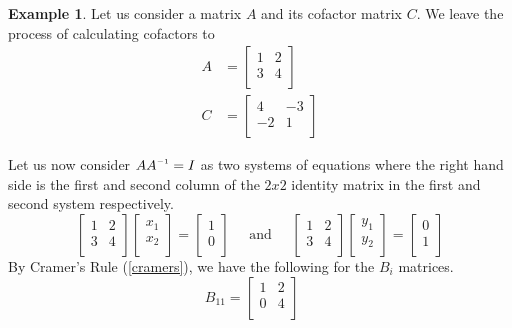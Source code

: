\documentclass[11pt,reqno]{amsart}
\theoremstyle{definition}
\newtheorem{example}[theorem]{Example}
\newcommand{\inv}{^{\raisebox{.2ex}{$\scriptscriptstyle-1$}}}
\begin{document}
\begin{example}
\label{4}
Let us consider a matrix $A$ and its cofactor matrix $C$. We leave the process of calculating cofactors to \cite[Chapter 5.2]{strang}
\begin{align*}A &=
\begin{bmatrix}
    1 & 2\\
    3 & 4\\
\end{bmatrix}\\
C &= 
\begin{bmatrix}
    4 & -3\\
    -2 & 1\\
\end{bmatrix}
\end{align*}

Let us now consider $AA\inv = I$ as two systems of equations where the right hand side is the first and second column of the $2x2$ identity matrix in the first and second system respectively. 
\[
\begin{bmatrix}
    1 & 2\\
    3 & 4\\
\end{bmatrix}
\begin{bmatrix}
    x_1\\
    x_2\\
\end{bmatrix}
= 
\begin{bmatrix}
    1\\
    0\\
\end{bmatrix}
\;\;\;\;\; \text{and}  \;\;\;\;\;
\begin{bmatrix}
    1 & 2\\
    3 & 4\\
\end{bmatrix}
\begin{bmatrix}
    y_1\\
    y_2\\
\end{bmatrix}
= 
\begin{bmatrix}
    0\\
    1\\
\end{bmatrix}
\]
By Cramer's Rule (\ref{cramers}), we have the following for the $B_i$ matrices.
\[
B_{11} = \begin{bmatrix}
    1 & 2\\
    0 & 4\\
\end{bmatrix} \;\;\;\;
\]
\end{example}
\end{document}
